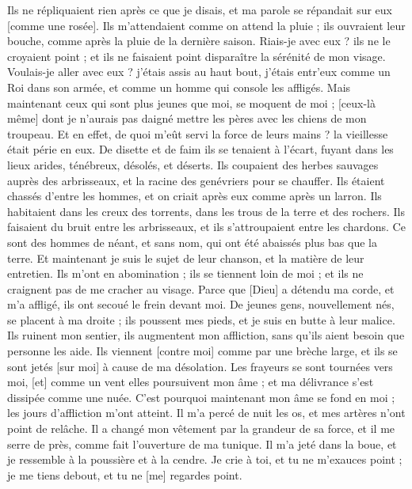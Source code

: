 \begin{multicols}{2}
Ils ne répliquaient rien après ce que je disais, et ma parole se répandait sur eux [comme une rosée].
Ils m'attendaient comme on attend la pluie ; ils ouvraient leur bouche, comme après la pluie de la dernière saison.
Riais-je avec eux ? ils ne le croyaient point ; et ils ne faisaient point disparaître la sérénité de mon visage.
Voulais-je aller avec eux ? j'étais assis au haut bout, j'étais entr'eux comme un Roi dans son armée, et comme un homme qui console les affligés.
\VerseOne{}Mais maintenant ceux qui sont plus jeunes que moi, se moquent de moi ; [ceux-là même] dont je n'aurais pas daigné mettre les pères avec les chiens de mon troupeau.
Et en effet, de quoi m'eût servi la force de leurs mains ? la vieillesse était périe en eux.
De disette et de faim ils se tenaient à l'écart, fuyant dans les lieux arides, ténébreux, désolés, et déserts.
Ils coupaient des herbes sauvages auprès des arbrisseaux, et la racine des genévriers pour se chauffer.
Ils étaient chassés d'entre les hommes, et on criait après eux comme après un larron.
Ils habitaient dans les creux des torrents, dans les trous de la terre et des rochers.
Ils faisaient du bruit entre les arbrisseaux, et ils s'attroupaient entre les chardons.
Ce sont des hommes de néant, et sans nom, qui ont été abaissés plus bas que la terre.
Et maintenant je suis le sujet de leur chanson, et la matière de leur entretien.
Ils m'ont en abomination ; ils se tiennent loin de moi ; et ils ne craignent pas de me cracher au visage.
Parce que [Dieu] a détendu ma corde, et m'a affligé, ils ont secoué le frein devant moi.
De jeunes gens, nouvellement nés, se placent à ma droite ; ils poussent mes pieds, et je suis en butte à leur malice.
Ils ruinent mon sentier, ils augmentent mon affliction, sans qu'ils aient besoin que personne les aide.
Ils viennent [contre moi] comme par une brèche large, et ils se sont jetés [sur moi] à cause de ma désolation.
Les frayeurs se sont tournées vers moi, [et] comme un vent elles poursuivent mon âme ; et ma délivrance s'est dissipée comme une nuée.
C'est pourquoi maintenant mon âme se fond en moi ; les jours d'affliction m'ont atteint.
Il m'a percé de nuit les os, et mes artères n'ont point de relâche.
Il a changé mon vêtement par la grandeur de sa force, et il me serre de près, comme fait l'ouverture de ma tunique.
Il m'a jeté dans la boue, et je ressemble à la poussière et à la cendre.
Je crie à toi, et tu ne m'exauces point ; je me tiens debout, et tu ne [me] regardes point.

\end{multicols}
